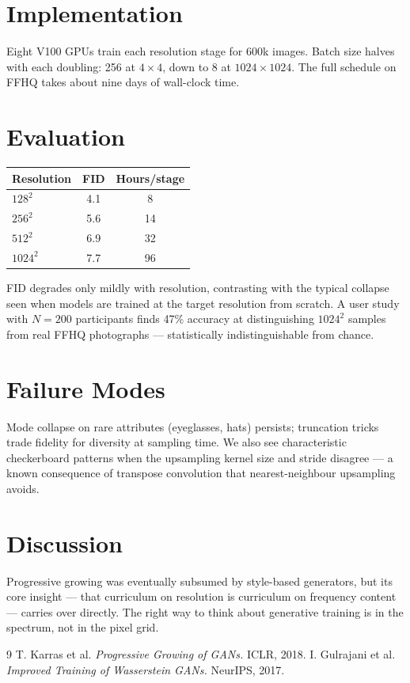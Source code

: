 \documentclass[11pt]{article}
\begin{document}
\section{Implementation}
Eight V100 GPUs train each resolution stage for 600k images. Batch size halves
with each doubling: 256 at $4\times4$, down to 8 at $1024\times1024$. The full
schedule on FFHQ takes about nine days of wall-clock time.

\section{Evaluation}
\begin{tabular}{lcc}
\hline
Resolution & FID & Hours/stage \\
\hline
$128^2$  & 4.1  & 8 \\
$256^2$  & 5.6  & 14 \\
$512^2$  & 6.9  & 32 \\
$1024^2$ & 7.7  & 96 \\
\hline
\end{tabular}

FID degrades only mildly with resolution, contrasting with the typical
collapse seen when models are trained at the target resolution from scratch.
A user study with $N=200$ participants finds 47\% accuracy at distinguishing
$1024^2$ samples from real FFHQ photographs --- statistically indistinguishable
from chance.

\section{Failure Modes}
Mode collapse on rare attributes (eyeglasses, hats) persists; truncation tricks
trade fidelity for diversity at sampling time. We also see characteristic
checkerboard patterns when the upsampling kernel size and stride disagree ---
a known consequence of transpose convolution that nearest-neighbour
upsampling avoids.

\section{Discussion}
Progressive growing was eventually subsumed by style-based generators, but its
core insight --- that curriculum on resolution is curriculum on frequency
content --- carries over directly. The right way to think about generative
training is in the spectrum, not in the pixel grid.


\begin{thebibliography}{9}
 T. Karras et al. \emph{Progressive Growing of GANs.} ICLR, 2018.
 I. Gulrajani et al. \emph{Improved Training of Wasserstein GANs.} NeurIPS, 2017.
\end{thebibliography}
\end{document}
